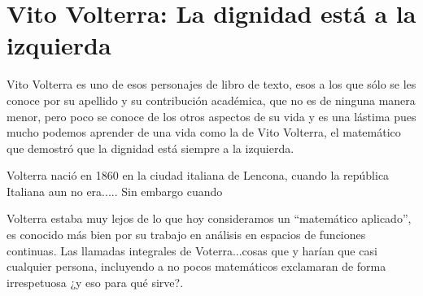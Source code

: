 \chapter{Vito Volterra: La dignidad está a la izquierda}

Vito Volterra es uno de esos personajes de libro de texto, esos a los que sólo se les conoce por su apellido y su contribución académica, que no es de ninguna manera menor, pero poco se conoce de los otros aspectos de su vida y es una lástima pues mucho podemos aprender de una vida como la de Vito Volterra, el matemático que demostró que la dignidad está siempre a la izquierda.

Volterra nació en 1860 en la ciudad italiana de Lencona, cuando la república Italiana aun no era..... Sin embargo cuando 

Volterra estaba muy lejos de lo que hoy consideramos un ``matemático aplicado'', es conocido más bien por su trabajo en análisis en espacios de funciones continuas. Las llamadas integrales de Voterra...cosas que y harían que casi cualquier persona, incluyendo a no pocos matemáticos exclamaran de forma  irrespetuosa ¿y eso para qué sirve?.

